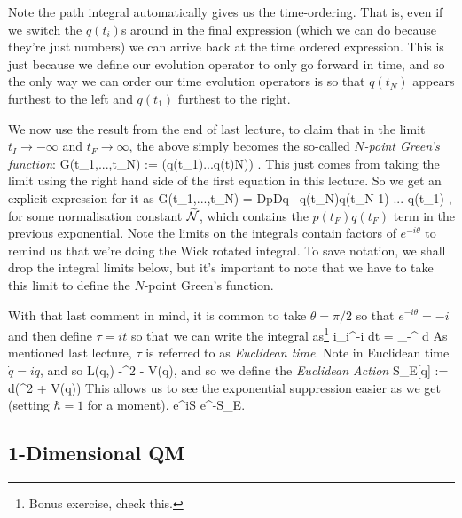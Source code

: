 \br 
\label{rem:PathIntegralTimeOrdered}
    Note the path integral automatically gives us the time-ordering. That is, even if we switch the $q(t_i)$s around in the final expression (which we can do because they're just numbers) we can arrive back at the time ordered expression. This is just because we define our evolution operator to only go forward in time, and so the only way we can order our time evolution operators is so that $q(t_N)$ appears furthest to the left and $q(t_1)$ furthest to the right.
\er 

We now use the result from the end of last lecture, to claim that in the limit $t_I\to-\infty$ and $t_F\to\infty$, the above simply becomes the so-called \textit{$N$-point Green's function}:
\bse 
    G(t_1,...,t_N) := \bra{\Omega} \cT \big(q(t_1)...q(t)N)\big) \ket{\Omega}.
\ese 
This just comes from taking the limit using the right hand side of the first equation in this lecture. So we get an explicit expression for it as 
\bse 
    G(t_1,...,t_N) = \widetilde{\cN} \int DpDq \, q(t_N)q(t_{N-1}) ... q(t_1) \exp {},
\ese 
for some normalisation constant $\widetilde{\mathcal{N}}$, which contains the $p(t_F)q(t_F)$ term in the previous exponential. Note the limits on the integrals contain factors of $e^{-i\theta}$ to remind us that we're doing the Wick rotated integral. To save notation, we shall drop the integral limits below, but it's important to note that we have to take this limit to define the $N$-point Green's function.

\br 
\label{rem:EuclideanTime}
    With that last comment in mind, it is common to take $\theta=\pi/2$ so that $e^{-i\theta}=-i$ and then define $\tau=it$ so that we can write the integral as\footnote{Bonus exercise, check this.} 
    \bse 
        i\int_{i\infty}^{-i\infty} dt =  \int_{-\infty}^{\infty} d\tau
    \ese 
    As mentioned last lecture, $\tau$ is referred to as \textit{Euclidean time}. Note in Euclidean time $\dot{q}=i\dot{q}$, and so 
    \bse 
        L(q,) \to -^2 - V(q),
    \ese 
    and so we define the \textit{Euclidean Action}
    \bse 
        S_E[q] := \int d\tau \bigg(^2 + V(q)\bigg)
    \ese 
    This allows us to see the exponential suppression easier as we get (setting $\hbar=1$ for a moment). 
    \bse 
        e^{iS} \to e^{-S_E}.
    \ese 
\er 

\subsection{1-Dimensional QM}

